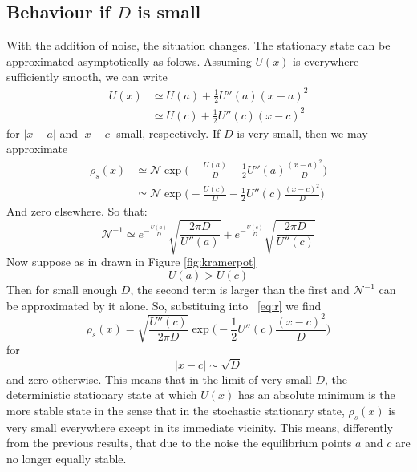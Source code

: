 \subsection{Behaviour if $D$ is small}
With the addition of noise, the situation changes. The stationary state can be approximated asymptotically as folows. Assuming $U(x)$ is everywhere sufficiently smooth, we can write
\begin{equation}
\begin{split}
U(x) & \simeq U(a) + \frac{1}{2} U''(a)(x-a)^2 \\
& \simeq U(c) + \frac{1}{2} U''(c)(x-c)^2 
\end{split}
\end{equation}
for $|x-a|$ and $|x-c|$ small, respectively.
If $D$ is very small, then we may approximate
\begin{equation}
\begin{split}
\rho_s(x)  &\simeq \mathcal{N} \exp\biggl(-\frac{U(a)}{D} - \frac{1}{2} U''(a)\frac{(x-a)^2}{D}\biggr) \\
&\simeq \mathcal{N} \exp\biggl(-\frac{U(c)}{D} - \frac{1}{2} U''(c)\frac{(x-c)^2}{D}\biggr) 
\end{split}
\label{eq:r}
\end{equation}
And zero elsewhere.
So that:
\begin{equation}
\mathcal{N}^{-1}  \simeq e^{-\frac{U(a)}{D}} \sqrt{\frac{ 2 \pi D }{U''(a)}} + e^{-\frac{U(c)}{D}} \sqrt{\frac{ 2 \pi D }{U''(c)}}
\end{equation}
Now suppose as in drawn in Figure \ref{fig:kramerpot} 
$$
U(a)>U(c)
$$
Then for small enough $D$, the second term is larger than the first and $\mathcal{N}^{-1}$ can be approximated by it alone. So, substituing into ~\ref{eq:r} we find
\begin{equation}
\rho_s(x) = \sqrt{\frac{U''(c)}{2 \pi D}} \exp\biggl(-\frac{1}{2}U''(c)\frac{(x-c)^2}{D}\biggr)
\end{equation}
for 
$$
|x-c| \sim \sqrt{D}
$$
and zero otherwise.
This means that in the limit of very small $D$, the deterministic stationary state at which $U(x)$ has an absolute minimum is the more stable state in the sense that in the stochastic stationary state, $\rho_s(x)$ is very small everywhere except in its immediate vicinity. This means, differently from the previous results, that due to the noise the  equilibrium points $a$ and $c$ are no longer equally stable.







